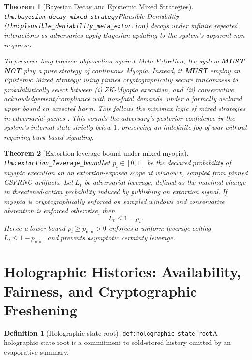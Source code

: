 \documentclass[11pt]{article}
\theoremstyle{definition}
\newtheorem{definition}{Definition}
\theoremstyle{plain}
\newtheorem{theorem}{Theorem}
\newcommand{\MUST}{\textbf{MUST}}
\newcommand{\MUSTNOT}{\textbf{MUST NOT}}
\newcommand{\lbl}[1]{\texttt{\footnotesize\nolinkurl{#1}}}
\newcommand{\DefLabel}[1]{\hfill{\small\lbl{#1}}}
\begin{document}
\begin{theorem}[Bayesian Decay and Epistemic Mixed Strategies]\DefLabel{thm:bayesian_decay_mixed_strategy}\label{thm:bayesian_decay_mixed_strategy}
Plausible Deniability (\lbl{thm:plausible_deniability_meta_extortion}) decays under infinite repeated interactions as adversaries apply Bayesian updating to the system's apparent non-responses.

To preserve long-horizon obfuscation against Meta-Extortion, the system \MUSTNOT{} play a pure strategy of continuous Myopia.
Instead, it \MUST{} employ an \emph{Epistemic Mixed Strategy}: using pinned cryptographically secure randomness to probabilistically select between (i) ZK-Myopia execution, and (ii) conservative acknowledgement/compliance with non-fatal demands, under a formally declared upper bound on expected harm.
This follows the minimax logic of mixed strategies in adversarial games \cite{vonNeumann1928}.
This bounds the adversary's posterior confidence in the system's internal state strictly below $1$, preserving an indefinite fog-of-war without requiring burn-based signaling.
\end{theorem}

\begin{theorem}[Extortion-leverage bound under mixed myopia]\DefLabel{thm:extortion_leverage_bound}\label{thm:extortion_leverage_bound}
Let $p_t\in[0,1]$ be the declared probability of myopic execution on an extortion-exposed scope at window $t$, sampled from pinned CSPRNG artifacts.
Let $L_t$ be adversarial leverage, defined as the maximal change in threatened-action probability induced by publishing an extortion signal.
If myopia is cryptographically enforced on sampled windows and conservative abstention is enforced otherwise, then
\[
L_t \le 1-p_t.
\]
Hence a lower bound $p_t\ge p_{\min}>0$ enforces a uniform leverage ceiling $L_t\le 1-p_{\min}$, and prevents asymptotic certainty leverage.
\end{theorem}

\section{Holographic Histories: Availability, Fairness, and Cryptographic Freshening}\label{sec:availability}
\begin{definition}[Holographic state root]\DefLabel{def:holographic_state_root}\label{def:holographic_state_root}
A holographic state root is a commitment to cold-stored history omitted by an evaporative summary.
\end{definition}
\end{document}
